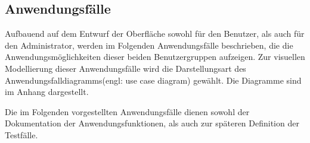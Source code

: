 \subsection{Anwendungsfälle}
\label{sec:Anwendungsfaelle}


Aufbauend auf dem Entwurf der Oberfläche sowohl für den Benutzer, als auch für den Administrator, werden im Folgenden Anwendungsfälle beschrieben, die die Anwendungsmöglichkeiten dieser beiden Benutzergruppen aufzeigen. Zur visuellen Modellierung dieser Anwendungsfälle wird die Darstellungsart des Anwendungsfalldiagramms\footnotemark (engl: use case diagram) gewählt. Die Diagramme sind im Anhang dargestellt.


Die im Folgenden vorgestellten Anwendungsfälle dienen sowohl der Dokumentation der Anwendungsfunktionen, als auch zur späteren Definition der Testfälle.


